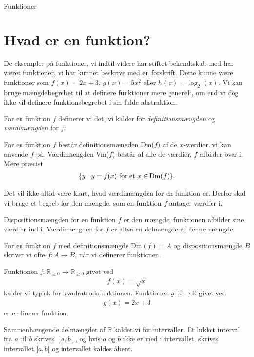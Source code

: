 \begin{center}
\Huge
	Funktioner	
\end{center}

\section*{Hvad er en funktion?}

De eksempler på funktioner, vi indtil videre har stiftet bekendtskab med har været funktioner, vi har kunnet beskrive med en forskrift. Dette kunne være funktioner som $f(x) = 2x+3$, $g(x) = 5x^2$ eller $h(x) = \log_2(x)$. Vi kan bruge mængdebegrebet til at definere funktioner mere generelt, om end vi dog ikke vil definere funktionsbegrebet i sin fulde abstraktion. 

For en funktion $f$ definerer vi det, vi kalder for \textit{definitionsmængden} og \textit{værdimængden} for $f$.
\begin{defn}
	For en funktion $f$ består definitionsmængden Dm($f$) af de $x$-værdier, vi kan anvende $f$ på.
	Værdimængden Vm($f$) består af alle de værdier, $f$ afbilder over i. Mere præcist
	\begin{align*}
		\{y  \mid  y = f(x) \textnormal{ for et } x \in \textnormal{Dm}(f)\}.
	\end{align*}
\end{defn}
Det vil ikke altid være klart, hvad værdimængden for en funktion er. Derfor skal vi bruge et begreb for den mængde, som en funktion $f$ antager værdier i. 
\begin{defn}[Dispositionsmængde]
	Dispositionsmængden for en funktion $f$ er den mængde, funktionen afbilder sine værdier ind i. Værdimængden 
	for $f$ er altså en delmængde af denne mængde. 
\end{defn}
For en funktion $f$ med definitionsmængde Dm$(f) = A$ og dispositionsmængde $B$ skriver vi ofte $f:A \to B$, når vi definerer funktionen. 
\begin{exa}
	Funktionen $f: \mathbb{R}_{\geq 0} \to \mathbb{R}_{\geq 0}$ givet ved
	\begin{align*}
		f(x) = \sqrt{x}
	\end{align*}
	kalder vi typisk for kvadratrodsfunktionen. 
	Funktionen $g:\mathbb{R} \to \mathbb{R}$ givet ved
	\begin{align*}
		g(x) = 2x + 3
	\end{align*}
	er en lineær funktion. 
\end{exa}
Sammenhængende delmængder af $\mathbb{R}$ kalder vi for intervaller. Et lukket interval fra $a$ til $b$ skrives $[a,b]$, og hvis $a$ og $b$ ikke er med i intervallet, skrives intervallet $]a,b[$ og intervallet kaldes åbent. 
